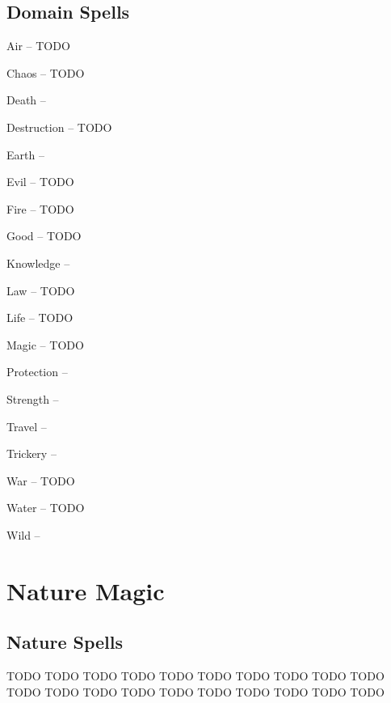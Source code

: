 \subsection{Domain Spells}\label{Domain Spells}
\begin{spelllist}
\item Air --  TODO
\item Chaos --  TODO
\item Death --  \tdash
\item Destruction --  TODO
\item Earth --  \tdash
\item Evil --  TODO
\item Fire --  TODO
\item Good --  TODO
\item Knowledge --  \tdash
\item Law --  TODO
\item Life --  TODO
\item Magic --  TODO
\item Protection --  \tdash
\item Strength --  \tdash
\item Travel --  \tdash
\item Trickery --  \tdash
\item War --  TODO
\item Water --  TODO
\item Wild --  \tdash
\end{spelllist}
\small
\section{Nature Magic}\label{Nature Magic}
\subsection{Nature Spells}\label{Nature Spells}
\begin{spelllist}
 TODO
 TODO
 TODO
 TODO
 TODO
 TODO
 TODO
 TODO
 TODO
 TODO
 TODO
 TODO
 TODO
 TODO
 TODO
 TODO
 TODO
 TODO
 TODO
 TODO
\end{spelllist}
